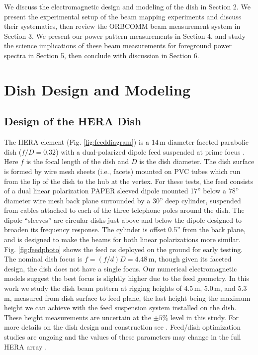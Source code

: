 \documentclass{emulateapj}
\begin{document}
We discuss the electromagnetic design and modeling of the dish in Section 2. We present the 
experimental setup of the beam mapping experiments and discuss their systematics, then 
review the ORBCOMM beam measurement system in Section 3. We present our power pattern 
measurements in Section 4, and study the science implications of these beam measurements for foreground power spectra in Section 5, then conclude with discussion in Section 6.

\section{Dish Design and Modeling}

\subsection{Design of the HERA Dish}

The HERA element (Fig. \ref{fig:feeddiagram}) is a 14\,m diameter faceted parabolic dish ($ f/D=0.32$) with a dual-polarized dipole feed suspended at prime focus \citep{dishmemo}. Here $f$ is the focal length of the dish and $D$ is the dish diameter. The dish surface is formed by wire mesh sheets (i.e., facets) mounted on PVC tubes which run from the lip of the dish to the hub at the vertex. For these tests, the feed consists of a dual linear polarization PAPER sleeved dipole mounted 17'' below a 78'' diameter wire mesh back plane surrounded by a 30'' deep cylinder, suspended from cables attached to each of the three telephone poles around the dish. The dipole ``sleeves'' are circular disks just above and below the dipole designed to broaden its frequency response. The cylinder is offset 0.5'' from the back plane, and is designed to make the beams for both linear polarizations more similar. Fig. \ref{fig:feedphoto} shows the feed as deployed on the ground for early testing.  The nominal dish focus is $f=(f/d)D=4.48$\,m, though given its faceted design, the dish does not have a single focus. Our numerical electromagnetic models suggest the best focus is slightly higher due to the feed geometry. In this work we study the dish beam pattern at rigging heights of 4.5\,m, 5.0\,m, and 5.3\,m, measured from dish surface to feed plane, the last height being the maximum height we can achieve with the feed suspension system installed on the dish. These height measurements are uncertain at the $\pm5\%$ level in this study. For more details on the dish design and construction see \citet{deboer16}. Feed/dish optimization studies are ongoing and the values of these parameters may change in the full HERA array \citep{feedoptimizationmemo}. 
\end{document}
